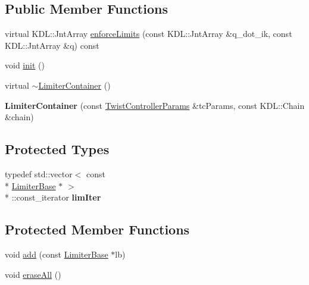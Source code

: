 \subsection*{Public Member Functions}
\begin{DoxyCompactItemize}
\item 
virtual K\-D\-L\-::\-Jnt\-Array \hyperlink{classLimiterContainer_a4df93d61aeb9e44c30127a1a2c8d0bd9}{enforce\-Limits} (const K\-D\-L\-::\-Jnt\-Array \&q\-\_\-dot\-\_\-ik, const K\-D\-L\-::\-Jnt\-Array \&q) const 
\item 
void \hyperlink{classLimiterContainer_a28eac48f36b165d02c86449189aacea2}{init} ()
\item 
virtual \hyperlink{classLimiterContainer_a4284c7a1f5094fbe24e0cd51f7bda6ab}{$\sim$\-Limiter\-Container} ()
\item 
\hypertarget{classLimiterContainer_a0aac7f3db0d1639b8bf38365e6e4a34c}{{\bfseries Limiter\-Container} (const \hyperlink{structTwistControllerParams}{Twist\-Controller\-Params} \&tc\-Params, const K\-D\-L\-::\-Chain \&chain)}\label{classLimiterContainer_a0aac7f3db0d1639b8bf38365e6e4a34c}

\end{DoxyCompactItemize}
\subsection*{Protected Types}
\begin{DoxyCompactItemize}
\item 
\hypertarget{classLimiterContainer_a32daab69a85e6f3ec090c9be462a88e0}{typedef std\-::vector$<$ const \\*
\hyperlink{classLimiterBase}{Limiter\-Base} $\ast$ $>$\\*
\-::const\-\_\-iterator {\bfseries lim\-Iter}}\label{classLimiterContainer_a32daab69a85e6f3ec090c9be462a88e0}

\end{DoxyCompactItemize}
\subsection*{Protected Member Functions}
\begin{DoxyCompactItemize}
\item 
void \hyperlink{classLimiterContainer_aef4914ff51be7ed8c563d47de9f316e8}{add} (const \hyperlink{classLimiterBase}{Limiter\-Base} $\ast$lb)
\item 
void \hyperlink{classLimiterContainer_a62b339d250d1d68fda7404d6fe89468b}{erase\-All} ()
\end{DoxyCompactItemize}
